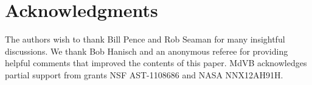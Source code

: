 \documentclass[final,authoryear,5p,times,twocolumn]{elsarticle}
\begin{document}
{{\section{Acknowledgments}


The authors wish to thank Bill Pence and Rob Seaman for many insightful
discussions.  We thank Bob Hanisch and an anonymous referee for providing
helpful comments that improved the contents of this paper.
MdVB acknowledges partial support from grants NSF AST-1108686 and NASA
NNX12AH91H.






}}
\end{document}

